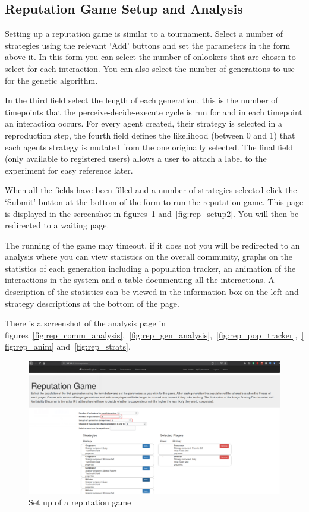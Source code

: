 \documentclass[]{final_report}
\begin{document}
\subsection{Reputation Game Setup and Analysis}
Setting up a reputation game is similar to a tournament. Select a number of strategies using the relevant `Add' buttons and set the parameters in the form above it. In this form you can select the number of onlookers that are chosen to select for each interaction. You can also select the number of generations to use for the genetic algorithm.\par 
In the third field select the length of each generation, this is the number of timepoints that the perceive-decide-execute cycle is run for and in each timepoint an interaction occurs. For every agent created, their strategy is selected in a reproduction step, the fourth field defines the likelihood (between 0 and 1) that each agents strategy is mutated from the one originally selected. The final field (only available to registered users) allows a user to attach a label to the experiment for easy reference later.\par 
When all the fields have been filled and a number of strategies selected click the `Submit' button at the bottom of the form to run the reputation game. This page is displayed in the screenshot in figures~\ref{fig:rep_setup} and~\ref{fig:rep_setup2}. You will then be redirected to a waiting page.\par 
The running of the game may timeout, if it does not you will be redirected to an analysis where you can view statistics on the overall community, graphs on the statistics of each generation including a population tracker, an animation of the interactions in the system and a table documenting all the interactions. A description of the statistics can be viewed in the information box on the left and strategy descriptions at the bottom of the page.\par 
There is a screenshot of the analysis page in figures~\ref{fig:rep_comm_analysis},~\ref{fig:rep_gen_analysis},~\ref{fig:rep_pop_tracker},~\ref{fig:rep_anim} and~\ref{fig:rep_strats}.
\begin{figure}
	\includegraphics[width=\textwidth]{RepSetup.png}
	\caption{Set up of a reputation game}
	\label{fig:rep_setup}
\end{figure}
\end{document}
